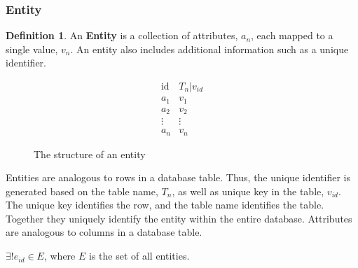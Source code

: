 \documentclass[12pt,letterpaper,oneside]{report}
\theoremstyle{definition}
\newtheorem{defn}{Definition}
\begin{document}
				\subsubsection{Entity}
					\begin{defn}
						An \textbf{Entity} is a collection of attributes, $a_n$, each mapped to a single value, $v_n$.  An entity also includes additional information such as a unique identifier.

						\begin{figure}[!ht]
							\centering
							\[
								\begin{array}{ll}
									\mathrm{id} & T_n|v_{id} \\
									a_1 & v_1 \\
									a_2 & v_2 \\
									\vdots & \vdots \\
									a_n & v_n
								\end{array}
							\]
							\caption{The structure of an entity}
							\label{fig:entity-rep}
						\end{figure}

						Entities are analogous to rows in a database table.  Thus, the unique identifier is generated based on the table name, $T_n$, as well as unique key in the table, $v_{id}$.  The unique key identifies the row, and the table name identifies the table.  Together they uniquely identify the entity within the entire database.  Attributes are analogous to columns in a database table.

						$\exists! e_{id} \in E$, where $E$ is the set of all entities.
					\end{defn}
\end{document}
